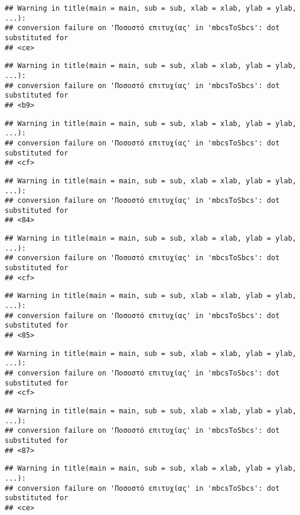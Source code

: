 \documentclass[
]{article}
\begin{document}
\begin{verbatim}
## Warning in title(main = main, sub = sub, xlab = xlab, ylab = ylab, ...):
## conversion failure on 'Ποσοστό επιτυχίας' in 'mbcsToSbcs': dot substituted for
## <ce>
\end{verbatim}

\begin{verbatim}
## Warning in title(main = main, sub = sub, xlab = xlab, ylab = ylab, ...):
## conversion failure on 'Ποσοστό επιτυχίας' in 'mbcsToSbcs': dot substituted for
## <b9>
\end{verbatim}

\begin{verbatim}
## Warning in title(main = main, sub = sub, xlab = xlab, ylab = ylab, ...):
## conversion failure on 'Ποσοστό επιτυχίας' in 'mbcsToSbcs': dot substituted for
## <cf>
\end{verbatim}

\begin{verbatim}
## Warning in title(main = main, sub = sub, xlab = xlab, ylab = ylab, ...):
## conversion failure on 'Ποσοστό επιτυχίας' in 'mbcsToSbcs': dot substituted for
## <84>
\end{verbatim}

\begin{verbatim}
## Warning in title(main = main, sub = sub, xlab = xlab, ylab = ylab, ...):
## conversion failure on 'Ποσοστό επιτυχίας' in 'mbcsToSbcs': dot substituted for
## <cf>
\end{verbatim}

\begin{verbatim}
## Warning in title(main = main, sub = sub, xlab = xlab, ylab = ylab, ...):
## conversion failure on 'Ποσοστό επιτυχίας' in 'mbcsToSbcs': dot substituted for
## <85>
\end{verbatim}

\begin{verbatim}
## Warning in title(main = main, sub = sub, xlab = xlab, ylab = ylab, ...):
## conversion failure on 'Ποσοστό επιτυχίας' in 'mbcsToSbcs': dot substituted for
## <cf>
\end{verbatim}

\begin{verbatim}
## Warning in title(main = main, sub = sub, xlab = xlab, ylab = ylab, ...):
## conversion failure on 'Ποσοστό επιτυχίας' in 'mbcsToSbcs': dot substituted for
## <87>
\end{verbatim}

\begin{verbatim}
## Warning in title(main = main, sub = sub, xlab = xlab, ylab = ylab, ...):
## conversion failure on 'Ποσοστό επιτυχίας' in 'mbcsToSbcs': dot substituted for
## <ce>
\end{verbatim}
\end{document}
